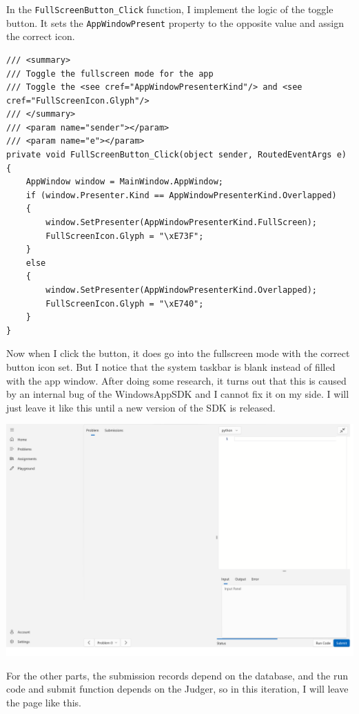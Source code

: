 \documentclass[a4paper]{report}
\newcommand{\code}{\texttt}
\begin{document}
In the \code{FullScreenButton_Click} function, I implement the logic of the toggle button. It sets the \code{AppWindowPresent} property\cite{microsoft:docs:windowing-overview} to the opposite value and assign the correct icon\cite{microsoft:docs:segoe-fluent-icons-font}.

\begin{verbatim}
/// <summary>
/// Toggle the fullscreen mode for the app
/// Toggle the <see cref="AppWindowPresenterKind"/> and <see cref="FullScreenIcon.Glyph"/>
/// </summary>
/// <param name="sender"></param>
/// <param name="e"></param>
private void FullScreenButton_Click(object sender, RoutedEventArgs e)
{
    AppWindow window = MainWindow.AppWindow;
    if (window.Presenter.Kind == AppWindowPresenterKind.Overlapped)
    {
        window.SetPresenter(AppWindowPresenterKind.FullScreen);
        FullScreenIcon.Glyph = "\xE73F";
    }
    else
    {
        window.SetPresenter(AppWindowPresenterKind.Overlapped);
        FullScreenIcon.Glyph = "\xE740";
    }
}
\end{verbatim}

Now when I click the button, it does go into the fullscreen mode with the correct button icon set. But I notice that the system taskbar is blank instead of filled with the app window. After doing some research, it turns out that this is caused by an internal bug of the WindowsAppSDK\cite{github:WindowsAppSDK:1853} and I cannot fix it on my side. I will just leave it like this until a new version of the SDK is released.

\includegraphics[width=\textwidth, height=\textheight, keepaspectratio]{CodingPage-FullScreen-Bug.png}

For the other parts, the submission records depend on the database, and the run code and submit function depends on the Judger, so in this iteration, I will leave the page like this.
\end{document}
